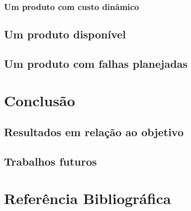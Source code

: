 \documentclass[]{../class/politex}
\begin{document}
      \subsection{Um produto com custo dinâmico}

    \section{Um produto disponível}

    \section{Um produto com falhas planejadas}

  \chapter{Conclusão}

    \section{Resultados em relação ao objetivo}

    \section{Trabalhos futuros}

  \chapter{Referência Bibliográfica}
\end{document}
